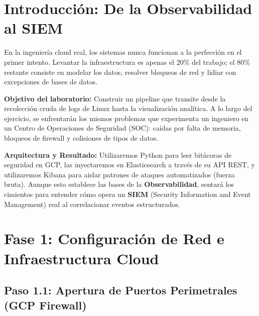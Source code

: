 \documentclass[
  coursetitle={Cómputo Nube y Tecnologías Emergentes},
  coursehours={96},
  coursedate={Verano 2026},
  doctype={Práctica},
  otherlangs={english,french},
  authorname={Lázaro},
  authorsurname={Bustio-Martínez},
  authortitle={PhD},
  role={Profesor Investigador},
  email={lbustio@inaoe.mx},
  phone={5559504000},
  ext={7459},
  institution={Instituto Nacional de Astrofísica, Óptica y Electrónica (INAOE)},
  department={Maestría en Ciencias en Tecnologías de Seguridad},
  address={Luis Enrique Erro 1, Sta. Ma. Tonantzintla, San Andrés Cholula, CP 72840, Puebla, México},
  margin={0.5in}
]{../../lbustio_lecture_notes}
\begin{document}
\IberoCover


\section{Introducción: De la Observabilidad al SIEM}
En la ingeniería cloud real, los sistemas nunca funcionan a la perfección en el primer intento. Levantar la infraestructura es apenas el 20\% del trabajo; el 80\% restante consiste en modelar los datos, resolver bloqueos de red y lidiar con excepciones de bases de datos. 

\textbf{Objetivo del laboratorio:} Construir un pipeline que transite desde la recolección cruda de logs de Linux hasta la visualización analítica. A lo largo del ejercicio, se enfrentarán los mismos problemas que experimenta un ingeniero en un Centro de Operaciones de Seguridad (SOC): caídas por falta de memoria, bloqueos de firewall y colisiones de tipos de datos.

\textbf{Arquitectura y Resultado:} Utilizaremos Python para leer bitácoras de seguridad en GCP, las inyectaremos en Elasticsearch a través de su API REST, y utilizaremos Kibana para aislar patrones de ataques automatizados (fuerza bruta). Aunque esto establece las bases de la \textbf{Observabilidad}, sentará los cimientos para entender cómo opera un \textbf{SIEM} (Security Information and Event Management) real al correlacionar eventos estructurados.

\section{Fase 1: Configuración de Red e Infraestructura Cloud}

\subsection{Paso 1.1: Apertura de Puertos Perimetrales (GCP Firewall)}
\end{document}

